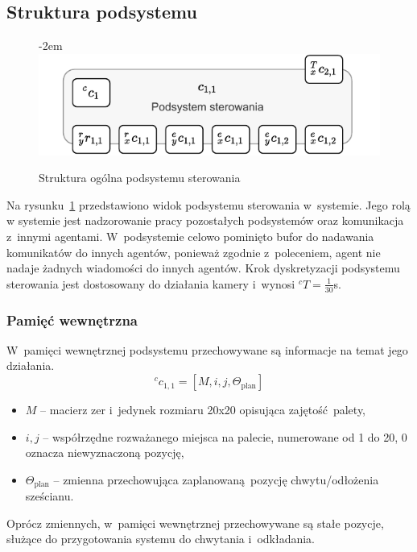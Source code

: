 \subsection{Struktura podsystemu}
\label{subsec:cs-struktura}

\begin{figure}[ht]
    \leftskip-2em
    \includegraphics[width=1.15\columnwidth]{figures/ISR-cs-model.pdf}
    \caption{Struktura ogólna podsystemu sterowania}
    \label{fig:model-cs}
\end{figure}

Na rysunku~\ref{fig:model-cs} przedstawiono widok podsystemu sterowania w~systemie. Jego rolą w systemie jest nadzorowanie pracy pozostałych podsystemów oraz komunikacja z~innymi agentami. W~podsystemie celowo pominięto bufor do nadawania komunikatów do innych agentów, ponieważ zgodnie z~poleceniem, agent nie nadaje żadnych wiadomości do innych agentów. Krok dyskretyzacji podsystemu sterowania jest dostosowany do działania kamery i~wynosi ${}^{c}T = \frac{1}{30}$s.

\subsubsection{Pamięć wewnętrzna}
W~pamięci wewnętrznej podsystemu przechowywane są informacje na temat jego działania.
\begin{equation}
    {}^{c}c_{1,1} = [M, i, j, \Theta_{\mathrm{plan}}]
\end{equation}

\begin{itemize}
    \item $M$ -- macierz zer i~jedynek rozmiaru 20x20 opisująca zajętość palety,
    \item $i,j$ -- współrzędne rozważanego miejsca na palecie, numerowane od 1 do 20, 0 oznacza niewyznaczoną pozycję,
    \item $\Theta_{\mathrm{plan}}$ -- zmienna przechowująca zaplanowaną pozycję chwytu/odłożenia sześcianu.
\end{itemize}

Oprócz zmiennych, w~pamięci wewnętrznej przechowywane są stałe pozycje, służące do przygotowania systemu do chwytania i~odkładania.

